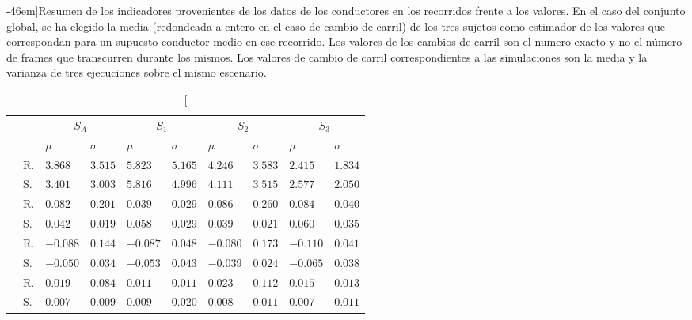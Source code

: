 \begin{table*}[!b]
	\centering
	\caption[Indicadores reales frente a indicadores capturados en simulación][-46em]{Resumen de los indicadores provenientes de los datos de los conductores en los recorridos frente a los valores. En el caso del conjunto global, se ha elegido la media (redondeada a entero en el caso de cambio de carril) de los tres sujetos como estimador de los valores que correspondan para un supuesto conductor medio en ese recorrido. Los valores de los cambios de carril son el numero exacto y no el número de frames que transcurren durante los mismos. Los valores de cambio de carril correspondientes a las simulaciones son la media y la varianza de tres ejecuciones sobre el mismo escenario.}
	\label{tbl:global-comparison-indicators}
	\begin{tabularx}{\linewidth}{cYYYYYYYYY}
		\toprule
		&                   &     &           &         &         \\
		                  & $\mu$     & $\sigma$ & $\mu$    & $\sigma$ & $\mu$     & $\sigma$  & $\mu$    & $\sigma$ \\
		\midrule
		     & R. & $3.868$  & $3.515$  & $5.823$  & $5.165$  & $4.246$  & $3.583$  & $2.415$  & $1.834$  \\
		& S. & $3.401$  & $3.003$  & $5.816$  & $4.996$  & $4.111$  & $3.515$  & $2.577$  & $2.050$  \\
		    & R. & $0.082$  & $0.201$  & $0.039$  & $0.029$  & $0.086$  & $0.260$  & $0.084$  & $0.040$  \\
		& S. & $0.042$  & $0.019$  & $0.058$  & $0.029$  & $0.039$  & $0.021$  & $0.060$  & $0.035$  \\
		    & R. & $-0.088$ & $0.144$  & $-0.087$ & $0.048$  & $-0.080$ & $0.173$  & $-0.110$ & $0.041$  \\
		& S. & $-0.050$ & $0.034$  & $-0.053$ & $0.043$  & $-0.039$ & $0.024$  & $-0.065$ & $0.038$  \\
		   & R. & $0.019$  & $0.084$  & $0.011$  & $0.011$  & $0.023$  & $0.112$  & $0.015$  & $0.013$  \\
		& S. & $0.007$  & $0.009$  & $0.009$  & $0.020$  & $0.008$  & $0.011$  & $0.007$  & $0.011$  \\

\end{tabularx}
\end{table*}
